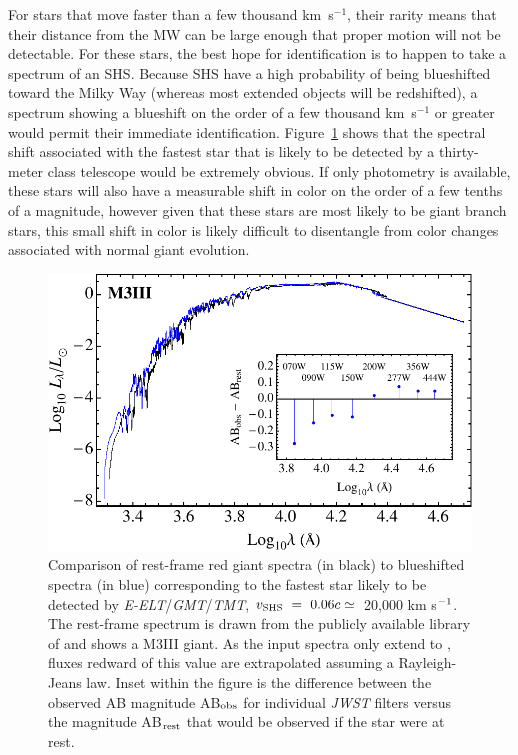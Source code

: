 \documentclass[a4paper,twocolumn]{emulateapj}
\begin{document}
{For stars that move faster than a few thousand km~s$^{-1}$, their rarity means that their distance from the MW can be large enough that proper motion will not be detectable. For these stars, the best hope for identification is to happen to take a spectrum of an SHS. Because SHS have a high probability of being blueshifted toward the Milky Way (whereas most extended objects will be redshifted), a spectrum showing a blueshift on the order of a few thousand km~s$^{-1}$ or greater would permit their immediate identification. Figure~\ref{fig:specs} shows that the spectral shift associated with the fastest star that is likely to be detected by a thirty-meter class telescope would be extremely obvious. If only photometry is available, these stars will also have a measurable shift in color on the order of a few tenths of a magnitude, however given that these stars are most likely to be giant branch stars, this small shift in color is likely difficult to disentangle from color changes associated with normal giant evolution.

\begin{figure}
\centering\includegraphics[width=0.9\linewidth,clip=true]{spec-m3iii}
\caption{Comparison of rest-frame red giant spectra (in black) to blueshifted spectra (in blue) corresponding to the fastest star likely to be detected by {\it E-ELT}/{\it GMT}/{\it TMT}, $v_{\rm SHS}~=~0.06c \simeq$~20,000 km s$^{\smash{-1}}$. The rest-frame spectrum is drawn from the publicly available library of \citet{Pickles:1998a} and shows a M3III giant. As the input spectra only extend to , fluxes redward of this value are extrapolated assuming a Rayleigh-Jeans law. Inset within the figure is the difference between the observed AB magnitude AB$_{\rm obs}$ for individual {\it JWST} filters versus the magnitude AB$_{\rm rest}$ that would be observed if the star were at rest.}
\label{fig:specs}
\end{figure}

}
\end{document}
